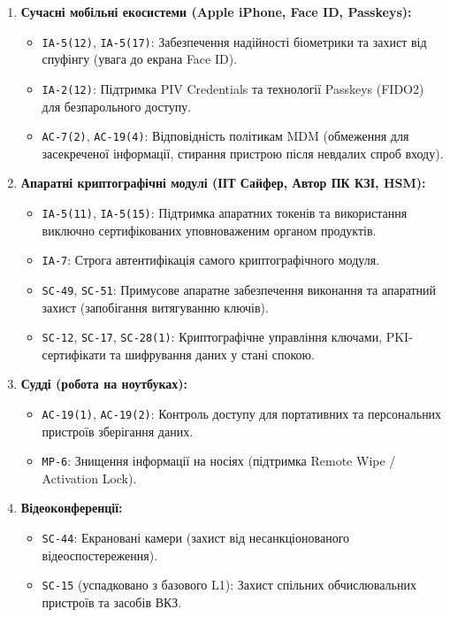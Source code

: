 \documentclass{article}
\begin{document}
\begin{enumerate}
    \item \textbf{Сучасні мобільні екосистеми (Apple iPhone, Face ID, Passkeys):}
    \begin{itemize}
        \item \texttt{IA-5(12)}, \texttt{IA-5(17)}: Забезпечення надійності біометрики та захист від спуфінгу (увага до екрана Face ID).
        \item \texttt{IA-2(12)}: Підтримка PIV Credentials та технології Passkeys (FIDO2) для безпарольного доступу.
        \item \texttt{AC-7(2)}, \texttt{AC-19(4)}: Відповідність політикам MDM (обмеження для засекреченої інформації, стирання пристрою після невдалих спроб входу).
    \end{itemize}

    \item \textbf{Апаратні криптографічні модулі (ІІТ Сайфер, Автор ПК КЗІ, HSM):}
    \begin{itemize}
        \item \texttt{IA-5(11)}, \texttt{IA-5(15)}: Підтримка апаратних токенів та використання виключно сертифікованих уповноваженим органом продуктів.
        \item \texttt{IA-7}: Строга автентифікація самого криптографічного модуля.
        \item \texttt{SC-49}, \texttt{SC-51}: Примусове апаратне забезпечення виконання та апаратний захист (запобігання витягуванню ключів).
        \item \texttt{SC-12}, \texttt{SC-17}, \texttt{SC-28(1)}: Криптографічне управління ключами, PKI-сертифікати та шифрування даних у стані спокою.
    \end{itemize}

    \item \textbf{Судді (робота на ноутбуках):}
    \begin{itemize}
        \item \texttt{AC-19(1)}, \texttt{AC-19(2)}: Контроль доступу для портативних та персональних пристроїв зберігання даних.
        \item \texttt{MP-6}: Знищення інформації на носіях (підтримка Remote Wipe / Activation Lock).
    \end{itemize}

    \item \textbf{Відеоконференції:}
    \begin{itemize}
        \item \texttt{SC-44}: Екрановані камери (захист від несанкціонованого відеоспостереження).
        \item \texttt{SC-15} (успадковано з базового L1): Захист спільних обчислювальних пристроїв та засобів ВКЗ.
    \end{itemize}


\end{enumerate}
\end{document}
